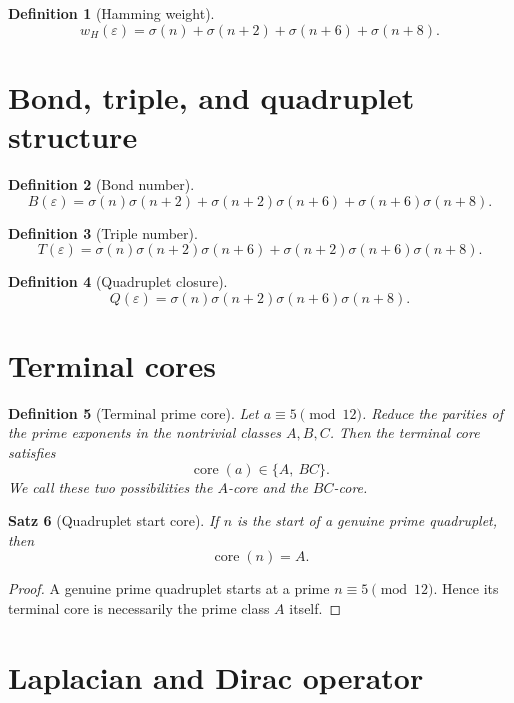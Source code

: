 \documentclass[11pt,a4paper]{article}
\newtheorem{definition}{Definition}[section]
\newtheorem{satz}[definition]{Satz}
\begin{document}
	\begin{definition}[Hamming weight]
		\[
		w_H(\varepsilon)=\sigma(n)+\sigma(n+2)+\sigma(n+6)+\sigma(n+8).
		\]
	\end{definition}
	
	\section{Bond, triple, and quadruplet structure}
	
	\begin{definition}[Bond number]
		\[
		B(\varepsilon)=
		\sigma(n)\sigma(n+2)
		+\sigma(n+2)\sigma(n+6)
		+\sigma(n+6)\sigma(n+8).
		\]
	\end{definition}
	
	\begin{definition}[Triple number]
		\[
		T(\varepsilon)=
		\sigma(n)\sigma(n+2)\sigma(n+6)
		+\sigma(n+2)\sigma(n+6)\sigma(n+8).
		\]
	\end{definition}
	
	\begin{definition}[Quadruplet closure]
		\[
		Q(\varepsilon)=\sigma(n)\sigma(n+2)\sigma(n+6)\sigma(n+8).
		\]
	\end{definition}
	
	\section{Terminal cores}
	
	\begin{definition}[Terminal prime core]
		Let $a\equiv 5\pmod{12}$. Reduce the parities of the prime exponents in the nontrivial classes $A,B,C$. Then the terminal core satisfies
		\[
		\operatorname{core}(a)\in\{A,\ BC\}.
		\]
		We call these two possibilities the $A$-core and the $BC$-core.
	\end{definition}
	
	\begin{satz}[Quadruplet start core]
		If $n$ is the start of a genuine prime quadruplet, then
		\[
		\operatorname{core}(n)=A.
		\]
	\end{satz}
	
	\begin{proof}
		A genuine prime quadruplet starts at a prime $n\equiv 5\pmod{12}$. Hence its terminal core is necessarily the prime class $A$ itself.
	\end{proof}
	
	\section{Laplacian and Dirac operator}
	
\end{document}

